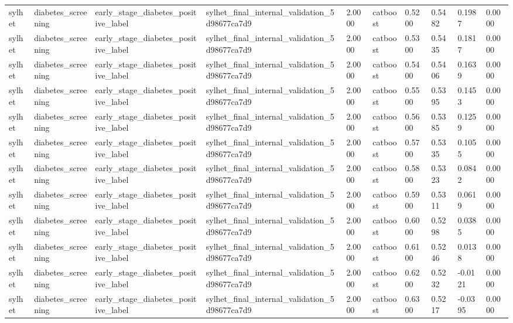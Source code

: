 \begin{tabular}{llllllllll}
sylhet & diabetes\_screening & early\_stage\_diabetes\_positive\_label & sylhet\_final\_internal\_validation\_5d98677ca7d9 & 2.0000 & catboost & 0.5200 & 0.5482 & 0.1987 & 0.0000 \\
sylhet & diabetes\_screening & early\_stage\_diabetes\_positive\_label & sylhet\_final\_internal\_validation\_5d98677ca7d9 & 2.0000 & catboost & 0.5300 & 0.5435 & 0.1817 & 0.0000 \\
sylhet & diabetes\_screening & early\_stage\_diabetes\_positive\_label & sylhet\_final\_internal\_validation\_5d98677ca7d9 & 2.0000 & catboost & 0.5400 & 0.5406 & 0.1639 & 0.0000 \\
sylhet & diabetes\_screening & early\_stage\_diabetes\_positive\_label & sylhet\_final\_internal\_validation\_5d98677ca7d9 & 2.0000 & catboost & 0.5500 & 0.5395 & 0.1453 & 0.0000 \\
sylhet & diabetes\_screening & early\_stage\_diabetes\_positive\_label & sylhet\_final\_internal\_validation\_5d98677ca7d9 & 2.0000 & catboost & 0.5600 & 0.5385 & 0.1259 & 0.0000 \\
sylhet & diabetes\_screening & early\_stage\_diabetes\_positive\_label & sylhet\_final\_internal\_validation\_5d98677ca7d9 & 2.0000 & catboost & 0.5700 & 0.5335 & 0.1055 & 0.0000 \\
sylhet & diabetes\_screening & early\_stage\_diabetes\_positive\_label & sylhet\_final\_internal\_validation\_5d98677ca7d9 & 2.0000 & catboost & 0.5800 & 0.5323 & 0.0842 & 0.0000 \\
sylhet & diabetes\_screening & early\_stage\_diabetes\_positive\_label & sylhet\_final\_internal\_validation\_5d98677ca7d9 & 2.0000 & catboost & 0.5900 & 0.5311 & 0.0619 & 0.0000 \\
sylhet & diabetes\_screening & early\_stage\_diabetes\_positive\_label & sylhet\_final\_internal\_validation\_5d98677ca7d9 & 2.0000 & catboost & 0.6000 & 0.5298 & 0.0385 & 0.0000 \\
sylhet & diabetes\_screening & early\_stage\_diabetes\_positive\_label & sylhet\_final\_internal\_validation\_5d98677ca7d9 & 2.0000 & catboost & 0.6100 & 0.5246 & 0.0138 & 0.0000 \\
sylhet & diabetes\_screening & early\_stage\_diabetes\_positive\_label & sylhet\_final\_internal\_validation\_5d98677ca7d9 & 2.0000 & catboost & 0.6200 & 0.5232 & -0.0121 & 0.0000 \\
sylhet & diabetes\_screening & early\_stage\_diabetes\_positive\_label & sylhet\_final\_internal\_validation\_5d98677ca7d9 & 2.0000 & catboost & 0.6300 & 0.5217 & -0.0395 & 0.0000 \\

\end{tabular}

